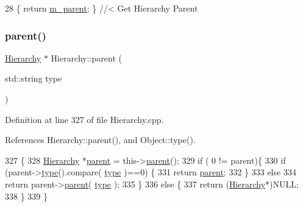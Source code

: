 \begin{DoxyCode}
28 \{ \textcolor{keywordflow}{return} \hyperlink{classHierarchy_a5814bb280d4e8539ab25ab6cbfb9cc4f}{m\_parent}; \}  \textcolor{comment}{//< Get Hierarchy Parent}
\end{DoxyCode}
\mbox{\label{classHierarchy_ad550588733bf75ac5c0fcfd7c8fd11a6}} 
\subsubsection{\texorpdfstring{parent()}{parent()}\hspace{0.1cm}{\footnotesize\ttfamily [2/2]}}
{\footnotesize\ttfamily \hyperlink{classHierarchy}{Hierarchy} $\ast$ Hierarchy\+::parent (\begin{DoxyParamCaption}\item[{std\+::string}]{type }\end{DoxyParamCaption})\hspace{0.3cm}{\ttfamily [inherited]}}



Definition at line 327 of file Hierarchy.\+cpp.



References Hierarchy\+::parent(), and Object\+::type().


\begin{DoxyCode}
327                                             \{
328   \hyperlink{classHierarchy}{Hierarchy} *\hyperlink{classHierarchy_a1c7bec8257e717f9c1465e06ebf845fc}{parent} = this->\hyperlink{classHierarchy_a1c7bec8257e717f9c1465e06ebf845fc}{parent}();
329   \textcolor{keywordflow}{if} ( 0 != parent)\{
330     \textcolor{keywordflow}{if} (parent->\hyperlink{classObject_a84f99f70f144a83e1582d1d0f84e4e62}{type}().compare( \hyperlink{classObject_a84f99f70f144a83e1582d1d0f84e4e62}{type} )==0) \{
331       \textcolor{keywordflow}{return} \hyperlink{classHierarchy_a1c7bec8257e717f9c1465e06ebf845fc}{parent};
332     \}
333     \textcolor{keywordflow}{else}
334       \textcolor{keywordflow}{return} parent->\hyperlink{classHierarchy_a1c7bec8257e717f9c1465e06ebf845fc}{parent}( \hyperlink{classObject_a84f99f70f144a83e1582d1d0f84e4e62}{type} );
335   \}
336   \textcolor{keywordflow}{else} \{
337     \textcolor{keywordflow}{return} (\hyperlink{classHierarchy}{Hierarchy}*)NULL;
338   \}
339 \}
\end{DoxyCode}
\mbox{\label{classHierarchy_aa7990fa7caf132d83e361ce033c6c65a}} 
